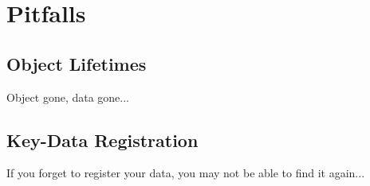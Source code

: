 \chapter{Pitfalls} \label{chap:pitfalls}

\section{Object Lifetimes}
Object gone, data gone...

\section{Key-Data Registration}
If you forget to register your data, you may not be able to find it again...